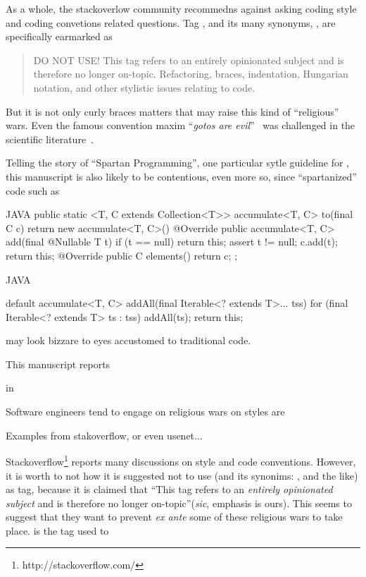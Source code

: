 As a whole, the stackoverlow community 
recommedns against asking coding style and coding convetions related questions. 
Tag , and its many synonyms, , 
 are specifically 
earmarked as 
\begin{quote}
DO NOT USE! This tag refers to an entirely opinionated subject and is therefore 
no longer on-topic. Refactoring, braces, indentation, Hungarian notation, and 
other stylistic issues relating to code. 
\end{quote}
But it is not only curly braces matters that may raise 
this kind of ``religious'' wars. Even the famous convention maxim ``\emph{gotos 
are evil}''~\cite{Dijksta:must be in bib} was challenged in the scientific 
literature~\cite{Knuth: and there are several others}.

Telling the story of ``Spartan Programming'', one particular sytle guideline for 
\Java, this manuscript is also likely to be contentious, even more so, since 
``spartanized'' code such as 
\begin{code}{JAVA}
  public static <T, C extends Collection<T>> 
                                accumulate<T, C> to(final C c) {
    return new accumulate<T, C>() {
      @Override public accumulate<T, C> add(final @Nullable T t) {
        if (t == null)
          return this;
        assert t != null;
        c.add(t);
        return this;
      }
      @Override public C elements() {
        return c;
      }
    };
  }
  \end{code}

\begin{code}{JAVA}

default accumulate<T, C> addAll(final Iterable<? extends T>... tss) {
  for (final Iterable<? extends T> ts : tss)
    addAll(ts);
  return this;
}
 
\end{code}

  
may look bizzare to eyes accustomed to traditional \Java code.


This manuscript reports 

in 

\Java
Software engineers tend to engage  on religious wars on styles are

Examples from stakoverflow, or even usenet... 

Stackoverflow\footnote{http://stackoverflow.com/} reports many discussions on style and code conventions. 
However, it is worth to not how it is suggested not to use  (and its synonims: , 
 and the like) as tag, because it is claimed that 
``This tag refers to an \emph{entirely opinionated subject} and is therefore no longer on-topic''(\emph{sic}, 
emphasis is ours). 
This seems to suggest that they want to prevent \emph{ex ante} some of these religious wars to take place.
 is the tag used to 

